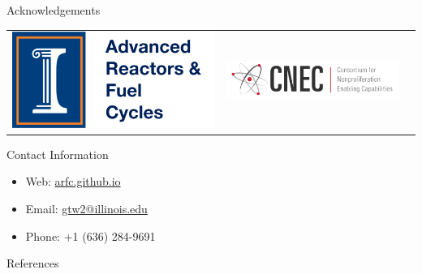 \documentclass[final]{beamer}
\newlength{\onecolwid}
\newlength{\threecolwid}
\begin{document}
\begin{frame}[t]
\begin{columns}[t,totalwidth=\threecolwid]
\begin{column}{\onecolwid}
\begin{block}{Acknowledgements}
	\vspace{10mm}
	\begin{center}
		\begin{tabular}{ccc}
			\includegraphics[width=0.3\linewidth]{logo.png} & \includegraphics[width=0.5\linewidth]{cnec_logo}
		\end{tabular}
	\end{center}
	
	
\end{block}





\begin{alertblock}{Contact Information}
	\begin{itemize}
		
		\item Web: \href{arfc.github.io}{arfc.github.io}
		\item Email: \href{mailto:gtw2@illinois.edu}{gtw2@illinois.edu}
		\item Phone: +1 (636) 284-9691
	\end{itemize}
	
\end{alertblock}

\begin{block}{References}

        {\footnotesize 
        }
\end{block}





\end{column} %

\end{columns} %

\end{frame} %
\end{document}

